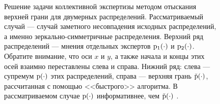 \begin{figure}[h]
\caption{\small Решение задачи коллективной экспертизы методом отыскания верхней грани для двумерных распределений. Рассматриваемый случай --- случай заметного несовпадения исходных распределений, а именно зеркально-симметричные распределения. Верхний ряд распределений --- мнения отдельных экспертов ${\mathrm{p}}_1(\cdot)$ и ${\mathrm{p}}_2(\cdot)$. Обратите внимание, что оси $x$ и $y$, а также начала и концы этих осей взаимно переставлены слева и справа. Нижний ряд: слева --- супремум  ${\mathrm{p}}(\cdot)$ этих распределений, справа --- верхняя грань $\check{{\mathrm{p}}}(\cdot)$, рассчитанная с помощью <<быстрого>> алгоритма. В рассматриваемом случае ${\mathrm{p}}(\cdot)$  информативнее, чем $\check{{\mathrm{p}}}(\cdot)$ .} 
\label{ris:nesovpali}
\end{figure}


